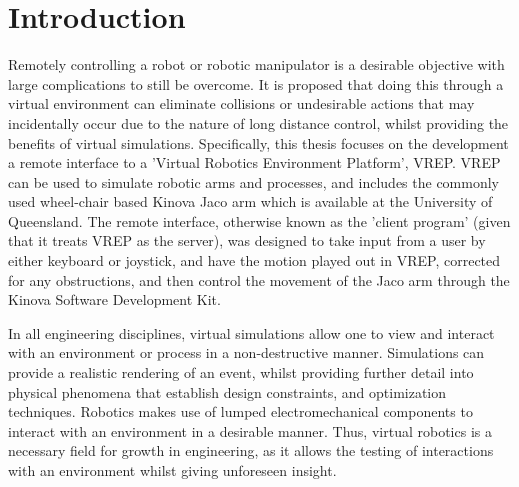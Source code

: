 \documentclass[12pt,openany,a4paper]{book}
\begin{document}
\cleardoublepage

\mainmatter


%
%
%
%	
%	

\chapter{Introduction}
Remotely controlling a robot or robotic manipulator is a desirable objective with large complications to still be overcome. It is proposed that doing this through a virtual environment can eliminate collisions or undesirable actions that may incidentally occur due to the nature of long distance control, whilst providing the benefits of virtual simulations. Specifically, this thesis focuses on the development a remote interface to a 'Virtual Robotics Environment Platform', VREP. VREP can be used to simulate robotic arms and processes, and includes the commonly used wheel-chair based Kinova Jaco arm which is available at the University of Queensland. The remote interface, otherwise known as the 'client program' (given that it treats VREP as the server), was designed to take input from a user by either keyboard or joystick, and have the motion played out in VREP, corrected for any obstructions, and then control the movement of the Jaco arm through the Kinova Software Development Kit.

In all engineering disciplines, virtual simulations allow one to view and interact with an environment or process in a non-destructive manner. Simulations can provide a realistic rendering of an event, whilst providing further detail into physical phenomena that establish design constraints, and optimization techniques. Robotics makes use of lumped electromechanical components to interact with an environment in a desirable manner. Thus, virtual robotics is a necessary field for growth in engineering, as it allows the testing of interactions with an environment whilst giving unforeseen insight.
\end{document}
